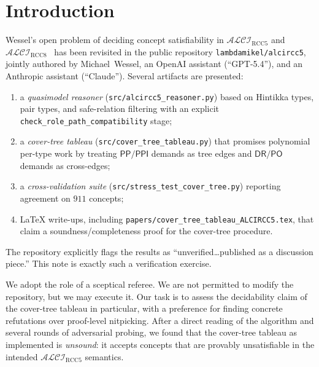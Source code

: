\documentclass[]{ceurart}
\newcommand{\ALCI}{\mathcal{ALCI}}
\newcommand{\ALCIRCC}[1]{\ALCI_{\mathrm{RCC}#1}}
\newcommand{\DR}{\mathsf{DR}}
\newcommand{\PO}{\mathsf{PO}}
\newcommand{\PP}{\mathsf{PP}}
\newcommand{\PPI}{\mathsf{PPI}}
\theoremstyle{definition}
\theoremstyle{remark}
\begin{document}
\maketitle

\section{Introduction}
\label{sec:intro}

Wessel's open problem of deciding concept satisfiability in
$\ALCIRCC{5}$ and $\ALCIRCC{8}$~\cite{wessel2002} has been revisited
in the public repository
\verb|lambdamikel/alcircc5|, jointly authored by Michael~Wessel,
an OpenAI assistant (``GPT-5.4''), and an Anthropic assistant
(``Claude''). Several artifacts are presented:
\begin{enumerate}
  \item a \emph{quasimodel reasoner}
    (\verb|src/alcircc5_reasoner.py|) based on Hintikka types, pair
    types, and safe-relation filtering with an explicit
    \verb|check_role_path_compatibility| stage;
  \item a \emph{cover-tree tableau}
    (\verb|src/cover_tree_tableau.py|) that promises polynomial per-type
    work by treating $\PP/\PPI$ demands as tree edges and
    $\DR/\PO$ demands as cross-edges;
  \item a \emph{cross-validation suite}
    (\verb|src/stress_test_cover_tree.py|) reporting agreement on
    $911$ concepts;
  \item LaTeX write-ups, including
    \verb|papers/cover_tree_tableau_ALCIRCC5.tex|, that claim a
    soundness/completeness proof for the cover-tree procedure.
\end{enumerate}
The repository explicitly flags the results as
``unverified\ldots published as a discussion piece.''  This note is
exactly such a verification exercise.

We adopt the role of a sceptical referee. We are not permitted to
modify the repository, but we may execute it. Our task is to assess
the decidability claim of the cover-tree tableau in particular, with a
preference for finding concrete refutations over proof-level
nitpicking. After a direct reading of the algorithm and several
rounds of adversarial probing, we found that the cover-tree tableau
as implemented is \emph{unsound}: it accepts concepts that are
provably unsatisfiable in the intended $\ALCIRCC{5}$ semantics.
\end{document}

